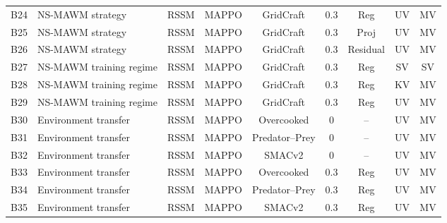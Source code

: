 \documentclass{article}
\theoremstyle{plain}
\theoremstyle{definition}
\theoremstyle{remark}
\begin{document}
\begin{table}[h!]
{\begin{tabular}{llccccccc}
      \midrule

      B24           & NS-MAWM strategy        &
      RSSM          & MAPPO                   & GridCraft      & 0.3 & Reg      & UV & MV \\
      B25           & NS-MAWM strategy        &
      RSSM          & MAPPO                   & GridCraft      & 0.3 & Proj     & UV & MV \\
      B26           & NS-MAWM strategy        &
      RSSM          & MAPPO                   & GridCraft      & 0.3 & Residual & UV & MV \\

      \midrule

      B27           & NS-MAWM training regime &
      RSSM          & MAPPO                   & GridCraft      & 0.3 & Reg      & SV & SV \\
      B28           & NS-MAWM training regime &
      RSSM          & MAPPO                   & GridCraft      & 0.3 & Reg      & KV & MV \\
      B29           & NS-MAWM training regime &
      RSSM          & MAPPO                   & GridCraft      & 0.3 & Reg      & UV & MV \\

      \midrule

      B30           & Environment transfer    &
      RSSM          & MAPPO                   & Overcooked     & 0   & --       & UV & MV \\
      B31           & Environment transfer    &
      RSSM          & MAPPO                   & Predator--Prey & 0   & --       & UV & MV \\
      B32           & Environment transfer    &
      RSSM          & MAPPO                   & SMACv2         & 0   & --       & UV & MV \\

      B33           & Environment transfer    &
      RSSM          & MAPPO                   & Overcooked     & 0.3 & Reg      & UV & MV \\
      B34           & Environment transfer    &
      RSSM          & MAPPO                   & Predator--Prey & 0.3 & Reg      & UV & MV \\
      B35           & Environment transfer    &
      RSSM          & MAPPO                   & SMACv2         & 0.3 & Reg      & UV & MV \\

      \midrule


\end{tabular}}
\end{table}
\end{document}
